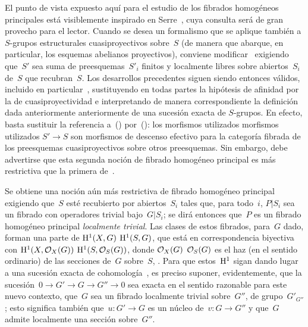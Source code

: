 \begin{remarques}
\label{XI.4.6}
El punto de vista expuesto aquí para el estudio de los fibrados homogéneos
principales está visiblemente inspirado en Serre~\cite{XI.7}, cuya consulta
será de gran provecho para el lector. Cuando se desea un formalismo que se
aplique también a $S$-grupos estructurales cuasiproyectivos sobre~$S$ (de
manera que abarque, en particular, los esquemas abelianos proyectivos),
conviene modificar~ exigiendo que~$S'$ sea suma de
preesquemas~$S'_i$ finitos y localmente libres sobre abiertos~$S_i$ de~$S$
que recubran~$S$. Los desarrollos precedentes siguen siendo entonces
válidos, incluido en particular~, sustituyendo en todas partes la
hipótesis de afinidad por la de cuasiproyectividad e interpretando de manera
correspondiente la definición dada
{anteriormente}
{anteriormente}
de una sucesión exacta de $S$-grupos. En efecto, basta sustituir la referencia
a~()
por~(): los
{morfismos utilizados}
{morfismos utilizados}
$S'\to S$ son morfismos de descenso efectivo para la categoría fibrada de
los preesquemas cuasiproyectivos sobre otros preesquemas. Sin embargo, debe
advertirse que esta segunda noción de fibrado homogéneo principal es más
restrictiva que la primera de~.
\end{remarques}

\sganum
\label{XI.4.7}
Se obtiene una noción aún más restrictiva de fibrado homogéneo principal
exigiendo que~$S$ esté recubierto por abiertos~$S_i$ tales que, para todo~$i$,
$P|S_i$ sea un fibrado con operadores trivial bajo~$G|S_i$; se dirá entonces
que~$P$ es un fibrado homogéneo principal \emph{localmente trivial}.
%
Las clases de estos fibrados, para~$G$ dado, forman una parte de
{$\H^1(X,G)$}
{$\H^1(S,G)$},
que está en correspondencia biyectiva con
{$\H^1(X,\cal{O}_X(G))$}
{$\H^1(S,\cal{O}_S(G))$},
donde
{$\cal{O}_X(G)$}
{$\cal{O}_S(G)$}
es el haz (en el sentido ordinario) de las secciones
de~$G$ sobre~$S$, \cf \cite{XI.2}. Para que estos~$\H^1$ sigan dando lugar a
una sucesión exacta de cohomología~, es preciso suponer,
evidentemente, que la sucesión~$0\to G'\to G\to G''\to 0$ sea exacta en el
sentido razonable para este nuevo contexto, \ie que~$G$ sea un fibrado
localmente trivial sobre~$G''$, de grupo~$G'_{G''}$; esto significa también
que~$u\colon G'\to G$ es un núcleo de~$v\colon G\to G''$ y que~$G$ admite
localmente una sección sobre~$G''$.

